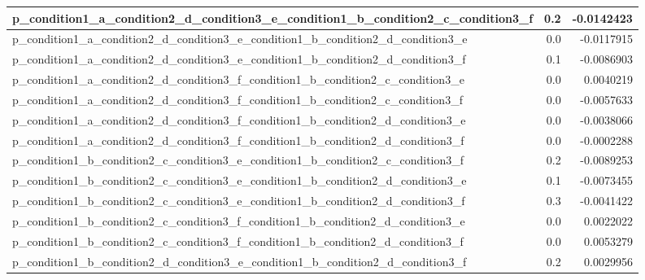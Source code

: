 \documentclass[
]{book}
\newenvironment{Shaded}{\begin{snugshade}}{\end{snugshade}}
\newcommand{\ControlFlowTok}[1]{\textcolor[rgb]{0.13,0.29,0.53}{\textbf{#1}}}
\newcommand{\DecValTok}[1]{\textcolor[rgb]{0.00,0.00,0.81}{#1}}
\newcommand{\FloatTok}[1]{\textcolor[rgb]{0.00,0.00,0.81}{#1}}
\newcommand{\FunctionTok}[1]{\textcolor[rgb]{0.00,0.00,0.00}{#1}}
\newcommand{\NormalTok}[1]{#1}
\newcommand{\SpecialCharTok}[1]{\textcolor[rgb]{0.00,0.00,0.00}{#1}}
\begin{document}
\begin{table}[!h]
\begin{tabular}[t]{l|r|r}
\hline
p\_condition1\_a\_condition2\_d\_condition3\_e\_condition1\_b\_condition2\_c\_condition3\_f & 0.2 & -0.0142423\\
\hline
p\_condition1\_a\_condition2\_d\_condition3\_e\_condition1\_b\_condition2\_d\_condition3\_e & 0.0 & -0.0117915\\
\hline
p\_condition1\_a\_condition2\_d\_condition3\_e\_condition1\_b\_condition2\_d\_condition3\_f & 0.1 & -0.0086903\\
\hline
p\_condition1\_a\_condition2\_d\_condition3\_f\_condition1\_b\_condition2\_c\_condition3\_e & 0.0 & 0.0040219\\
\hline
p\_condition1\_a\_condition2\_d\_condition3\_f\_condition1\_b\_condition2\_c\_condition3\_f & 0.0 & -0.0057633\\
\hline
p\_condition1\_a\_condition2\_d\_condition3\_f\_condition1\_b\_condition2\_d\_condition3\_e & 0.0 & -0.0038066\\
\hline
p\_condition1\_a\_condition2\_d\_condition3\_f\_condition1\_b\_condition2\_d\_condition3\_f & 0.0 & -0.0002288\\
\hline
p\_condition1\_b\_condition2\_c\_condition3\_e\_condition1\_b\_condition2\_c\_condition3\_f & 0.2 & -0.0089253\\
\hline
p\_condition1\_b\_condition2\_c\_condition3\_e\_condition1\_b\_condition2\_d\_condition3\_e & 0.1 & -0.0073455\\
\hline
p\_condition1\_b\_condition2\_c\_condition3\_e\_condition1\_b\_condition2\_d\_condition3\_f & 0.3 & -0.0041422\\
\hline
p\_condition1\_b\_condition2\_c\_condition3\_f\_condition1\_b\_condition2\_d\_condition3\_e & 0.0 & 0.0022022\\
\hline
p\_condition1\_b\_condition2\_c\_condition3\_f\_condition1\_b\_condition2\_d\_condition3\_f & 0.0 & 0.0053279\\
\hline
p\_condition1\_b\_condition2\_d\_condition3\_e\_condition1\_b\_condition2\_d\_condition3\_f & 0.2 & 0.0029956\\
\hline
\end{tabular}
\end{table}

\begin{Shaded}
\end{Shaded}
\end{document}
